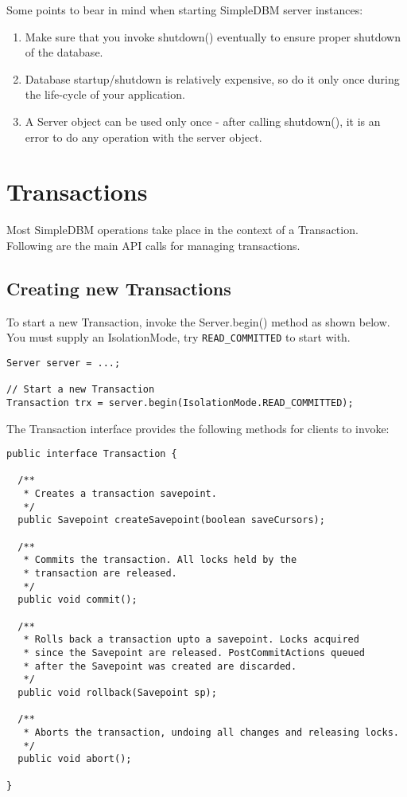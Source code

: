 \documentclass[a4paper,draft,oneside]{book}
\begin{document}
Some points to bear in mind when starting SimpleDBM server instances:

\begin{enumerate}
\item Make sure that you invoke shutdown() eventually to ensure proper
  shutdown of the database.
\item Database startup/shutdown is relatively expensive, so do it only
  once during the life-cycle of your application.
\item A Server object can be used only once - after calling
  shutdown(), it is an error to do any operation with the server
  object.
\end{enumerate}

\chapter{Transactions}

Most SimpleDBM operations take place in the context of a Transaction.
Following are the main API calls for managing transactions.

\section{Creating new Transactions}

To start a new Transaction, invoke the Server.begin() method as 
shown below. You must supply an IsolationMode, try \verb|READ_COMMITTED| to
start with.

\begin{verbatim}
Server server = ...;

// Start a new Transaction
Transaction trx = server.begin(IsolationMode.READ_COMMITTED);

\end{verbatim}

The Transaction interface provides the following methods for
clients to invoke:

\begin{verbatim}
public interface Transaction {
	
  /**
   * Creates a transaction savepoint.
   */
  public Savepoint createSavepoint(boolean saveCursors);

  /**
   * Commits the transaction. All locks held by the
   * transaction are released.
   */
  public void commit();	

  /**
   * Rolls back a transaction upto a savepoint. Locks acquired
   * since the Savepoint are released. PostCommitActions queued
   * after the Savepoint was created are discarded.
   */
  public void rollback(Savepoint sp);	

  /**
   * Aborts the transaction, undoing all changes and releasing locks.
   */
  public void abort();	

}
\end{verbatim}
\end{document}
